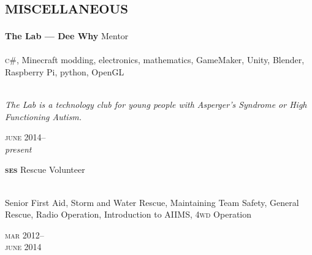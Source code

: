 

\section*{\textsc{miscellaneous}}
\vspace{-0.2cm}

\begin{minipage}[t]{0.75\textwidth}
\textbf{The Lab --- Dee Why}\phantom{..} Mentor \\
\\
\textsc{c\#}, Minecraft modding, electronics, mathematics, GameMaker, 
Unity, Blender, Raspberry Pi, python, OpenGL
\\
\\
{\small
\textit{The Lab is a technology club for young people with Asperger’s Syndrome or High Functioning Autism.}
\par}
\end{minipage}
\begin{minipage}[t]{0.25\textwidth}
{
\hfill \textsc{june} 2014--\\ 
\hspace*{0pt} \hfill \textit{present}
\par
}
\end{minipage}

\vspace{0.2in}

\begin{minipage}[t]{0.75\textwidth}
\textbf{\textsc{ses}}\phantom{..} Rescue Volunteer\\
\\
{\small
Senior First Aid, Storm and Water Rescue, Maintaining Team Safety, 
General Rescue, Radio Operation, Introduction to AIIMS, 
\textsc{4wd} Operation
\par}
\end{minipage}
\begin{minipage}[t]{0.25\textwidth}
{
\hfill \textsc{mar} 2012--\\ 
\hspace*{0pt} \hfill \textsc{june} 2014
\par
}
\end{minipage}

\vspace{0.2in}

